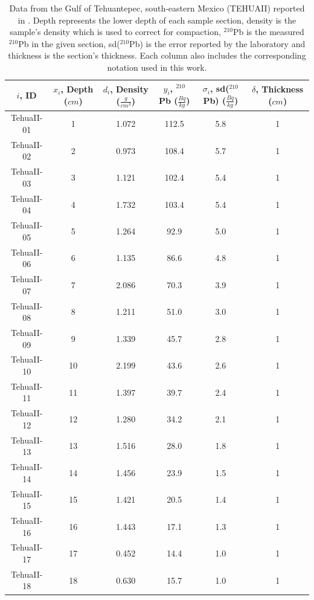 \documentclass [10pt] {article}
\begin{document}
\begin{table}[h!]
\centering
    \begin{tabular}{|c| c| c| c| c| c|}
\hline
	    $i$, ID & $x_i$, Depth ($cm$)  & $d_i$, Density ($\frac{g}{cm^3}$)  & $y_i$, $^{210}$Pb ($\frac{Bq}{kg}$) & $\sigma_i$, sd($^{210}$Pb) ($\frac{Bq}{kg}$) & $\delta$, Thickness ($cm$)   \\
\hline
TehuaII-01 & 1 & 1.072 & 112.5 & 5.8 & 1 \\
TehuaII-02 & 2 & 0.973 & 108.4 & 5.7 & 1 \\
TehuaII-03 & 3 & 1.121 & 102.4 & 5.4 & 1 \\
TehuaII-04 & 4 & 1.732 & 103.4 & 5.4 & 1 \\
TehuaII-05 & 5 & 1.264 & 92.9 & 5.0 & 1 \\
TehuaII-06 & 6 & 1.135 & 86.6 & 4.8 & 1 \\
TehuaII-07 & 7 & 2.086 & 70.3 & 3.9 & 1 \\
TehuaII-08 & 8 & 1.211 & 51.0 & 3.0 & 1 \\
TehuaII-09 & 9 & 1.339 & 45.7 & 2.8 & 1 \\
TehuaII-10 & 10 & 2.199 & 43.6 & 2.6 & 1 \\
TehuaII-11 & 11 & 1.397 & 39.7 & 2.4 & 1 \\
TehuaII-12 & 12 & 1.280 & 34.2 & 2.1 & 1 \\
TehuaII-13 & 13 & 1.516 & 28.0 & 1.8 & 1 \\
TehuaII-14 & 14 & 1.456 & 23.9 & 1.5 & 1 \\
TehuaII-15 & 15 & 1.421 & 20.5 & 1.4 & 1 \\
\hline
TehuaII-16 & 16 & 1.443 & 17.1 & 1.3 & 1 \\
TehuaII-17 & 17 & 0.452 & 14.4 & 1.0 & 1 \\
TehuaII-18 & 18 & 0.630 & 15.7 & 1.0 & 1 \\\hline
    \end{tabular}
	\caption{Data from the Gulf of Tehuantepec, south-eastern Mexico (TEHUAII) reported in \citet{Sanchez-Cabeza2012}. Depth represents the lower depth of each sample section, density is the sample's density which is used to correct for compaction, $^{210}$Pb is the measured $^{210}$Pb in the given section, sd($^{210}$Pb) is the error reported by the laboratory and thickness is the section's thickness. Each column also includes the corresponding notation used in this work.}
	\label{tab:tehuaii}
\end{table}


\end{document}
